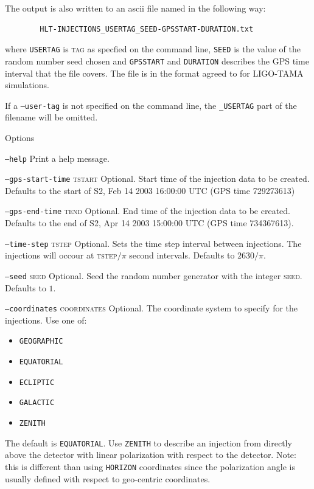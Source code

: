\begin{entry}
The output is also written to an ascii file named in the following way:
\begin{center}
\begin{verbatim}
        HLT-INJECTIONS_USERTAG_SEED-GPSSTART-DURATION.txt
\end{verbatim}
\end{center}
where \verb$USERTAG$ is \textsc{tag} as specfied on the command line, 
\verb$SEED$ is the  value  of  the random number seed chosen and 
\verb$GPSSTART$ and \verb$DURATION$ describes the GPS time interval that
the file covers. The file is in the format agreed to for LIGO-TAMA
simulations.  

If a \texttt{--user-tag} is not specified on the command line, the
\texttt{\_USERTAG} part of the filename will be omitted.

\item[Options]\leavevmode
\begin{entry}
\item[\texttt{--help}] Print a help message.

\item[\texttt{--gps-start-time} \textsc{tstart}]
Optional.  Start time of the injection data to be created. Defaults to the
start of S2, Feb 14 2003 16:00:00 UTC (GPS time 729273613)

\item[\texttt{--gps-end-time} \textsc{tend}]
Optional. End time of the injection data to be created. Defaults to the end of
S2, Apr 14 2003 15:00:00 UTC (GPS time 734367613).

\item[\texttt{--time-step} \textsc{tstep}]
Optional. Sets the time step interval between injections. The injections will
occour at \textsc{tstep}$/\pi$ second intervals. Defaults to $2630/\pi$.

\item[\texttt{--seed} \textsc{seed}]
Optional. Seed the random number generator with the integer \textsc{seed}.
Defaults to $1$.

\item[\texttt{--coordinates} \textsc{coordinates}] 
Optional.  The coordinate system to specify for the injections.  Use
one of:
\begin{itemize}
\item \texttt{GEOGRAPHIC}
\item \texttt{EQUATORIAL}
\item \texttt{ECLIPTIC}
\item \texttt{GALACTIC}
\item \texttt{ZENITH}
\end{itemize}
The default is \verb+EQUATORIAL+.   Use \verb+ZENITH+ to describe an
injection from directly above the detector with linear polarization
with respect to the detector.  Note:  this is different than using
\verb+HORIZON+ coordinates since the polarization angle is usually
defined with respect to geo-centric coordinates.


\end{entry}
\end{entry}
